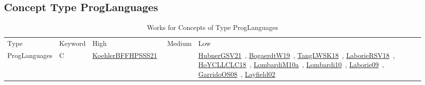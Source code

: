 \clearpage
\subsection{Concept Type ProgLanguages}
\label{sec:ProgLanguages}
{\scriptsize
\begin{longtable}{lp{3cm}>{\raggedright\arraybackslash}p{6cm}>{\raggedright\arraybackslash}p{6cm}>{\raggedright\arraybackslash}p{8cm}}
\rowcolor{white}\caption{Works for Concepts of Type ProgLanguages}\\ \toprule
\rowcolor{white}Type & Keyword & High & Medium & Low\\ \midrule\endhead
\bottomrule
\endfoot
ProgLanguages & C  & \href{works/KoehlerBFFHPSSS21.pdf}{KoehlerBFFHPSSS21}~\cite{KoehlerBFFHPSSS21} &  & \href{works/HubnerGSV21.pdf}{HubnerGSV21}~\cite{HubnerGSV21}, \href{works/BogaerdtW19.pdf}{BogaerdtW19}~\cite{BogaerdtW19}, \href{works/TangLWSK18.pdf}{TangLWSK18}~\cite{TangLWSK18}, \href{works/LaborieRSV18.pdf}{LaborieRSV18}~\cite{LaborieRSV18}, \href{works/HoYCLLCLC18.pdf}{HoYCLLCLC18}~\cite{HoYCLLCLC18}, \href{works/LombardiM10a.pdf}{LombardiM10a}~\cite{LombardiM10a}, \href{works/Lombardi10.pdf}{Lombardi10}~\cite{Lombardi10}, \href{works/Laborie09.pdf}{Laborie09}~\cite{Laborie09}, \href{works/GarridoOS08.pdf}{GarridoOS08}~\cite{GarridoOS08}, \href{works/Layfield02.pdf}{Layfield02}~\cite{Layfield02}\\

\end{longtable}}
